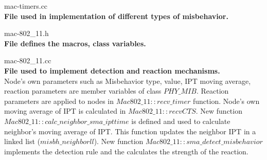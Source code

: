 \documentclass[12pt,letterpaper,english]{article}
\renewcommand{\thefigure}{\thesection.\arabic{figure}}
\begin{document}
\renewcommand{\thefigure}{A.\arabic{figure}}
\begin{singlespace}
mac-timers.cc
\\
\textbf{File used in implementation of different types of misbehavior.}
\\
\lstset{ %
  language=C++,               	  %
  basicstyle=\footnotesize,       %
  showspaces=false,               %
  showstringspaces=false,         %
  showtabs=false,                 %
  tabsize=2,                      %
  captionpos=t,                   %
  breaklines=true,                %
  breakatwhitespace=false,        %
}

mac-802\_11.h
\\
\textbf{File defines the macros, class variables.}
\\
\lstset{ %
  language=C++,               	  %
  basicstyle=\footnotesize,       %
  showspaces=false,               %
  showstringspaces=false,         %
  showtabs=false,                 %
  tabsize=2,                      %
  captionpos=t,                   %
  breaklines=true,                %
  breakatwhitespace=false,        %
}

mac-802\_11.cc
\\
\textbf{File used to implement detection and reaction mechanisms.}
\\
Node's own parameters such as Misbehavior type, value, IPT moving average, reaction parameters are member variables of class $PHY\_MIB$. Reaction parameters are applied to nodes in $Mac802\_11::recv\_timer$ function. Node's own moving average of IPT is calculated in $Mac802\_11::recvCTS$. New function $Mac802\_11::calc\_neighbor\_sma\_ipttime$ is defined and used to calculate neighbor's moving average of IPT. This function updates the neighbor IPT in a linked list ($misbh\_neighborll$).  New function  $Mac802\_11::sma\_detect\_misbehavior$ implements the detection rule and the calculates the strength of the reaction.

\end{singlespace}
\end{document}
